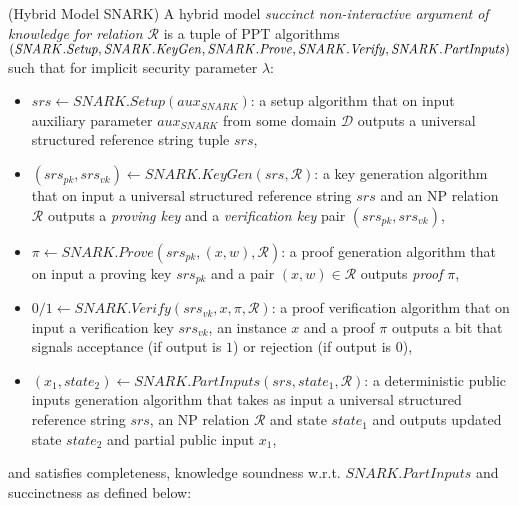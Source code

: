 \begin{definition}(Hybrid Model SNARK)
\label{dfn_snark}
A hybrid model \emph{succinct non-interactive argument of knowledge for relation $\mathcal{R}$} is a tuple of PPT algorithms 
$(\mathit{SNARK.Setup}, \mathit{SNARK.KeyGen}, \mathit{SNARK.Prove},  \mathit{SNARK.Verify},  \\ \mathit{SNARK.PartInputs})$ 
such that for implicit security parameter $\lambda$: 

\begin{itemize}
\item $\mathit{srs} \leftarrow \mathit{SNARK.Setup} (\mathit{aux_{\mathit{SNARK}}})$: a setup algorithm that on input auxiliary parameter 
$\mathit{aux_{\mathit{SNARK}}}$ from some domain $\mathcal{D}$ outputs a universal structured reference string tuple $\mathit{srs}$, 

\item $(\mathit{srs_{pk}}, \mathit{srs_{vk}}) \leftarrow \mathit{SNARK.KeyGen}(\mathit{srs}, \mathcal{R})$: a key generation algorithm that on input a
universal structured reference string $\mathit{srs}$ and an NP relation $\mathcal{R}$ outputs a \emph{proving key} and 
a \emph{verification key} pair $(\mathit{srs_{pk}}, \mathit{srs_{vk}})$,

\item $\pi \leftarrow \mathit{SNARK.Prove}(\mathit{srs_{pk}}, (x,w), \mathcal{R})$: a proof generation algorithm that on input a proving key 
$\mathit{srs_{pk}}$ and a pair $(x,w) \in \mathcal{R}$ outputs \emph{proof} $\pi$, 

\item $0/1 \leftarrow \mathit{SNARK.Verify}(\mathit{srs_{vk}}, x, \pi, \mathcal{R})$: a proof verification algorithm that on input a verification key 
$\mathit{srs_{vk}}$, an instance $x$ and a proof $\pi$ outputs a bit that signals acceptance (if output is $1$) or rejection (if output is $0$),

\item $(x_1, \mathit{state}_2) \leftarrow \mathit{SNARK.PartInputs}(\mathit{srs}, \mathit{state}_1, \mathcal{R})$: a deterministic 
public inputs generation algorithm that takes as input a universal structured reference string $\mathit{srs}$, an NP relation $\mathcal{R}$ and 
 state $\mathit{state}_1$ and outputs updated state $\mathit{state}_2$ and partial public input $x_1$,

\end{itemize}
and satisfies completeness, knowledge soundness w.r.t. $\mathit{SNARK.PartInputs}$ and succinctness as defined below:


\end{definition}
